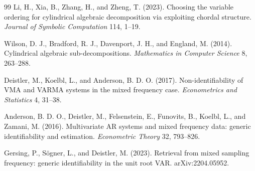 \documentclass{article}
\begin{document}
\begin{thebibliography}{99}
   Li, H., Xia, B., Zhang, H., and Zheng, T. (2023). Choosing the variable ordering for cylindrical algebraic decomposition via exploiting chordal structure. \emph{Journal of Symbolic Computation} 114, 1--19.

   Wilson, D. J., Bradford, R. J., Davenport, J. H., and England, M. (2014). Cylindrical algebraic sub-decompositions. \emph{Mathematics in Computer Science} 8, 263--288.

   Deistler, M., Koelbl, L., and Anderson, B. D. O. (2017). Non-identifiability of VMA and VARMA systems in the mixed frequency case. \emph{Econometrics and Statistics} 4, 31--38.

   Anderson, B. D. O., Deistler, M., Felsenstein, E., Funovits, B., Koelbl, L., and Zamani, M. (2016). Multivariate AR systems and mixed frequency data: generic identifiability and estimation. \emph{Econometric Theory} 32, 793--826.

   Gersing, P., Sögner, L., and Deistler, M. (2023). Retrieval from mixed sampling frequency: generic identifiability in the unit root VAR. arXiv:2204.05952.

\end{thebibliography}
\end{document}
